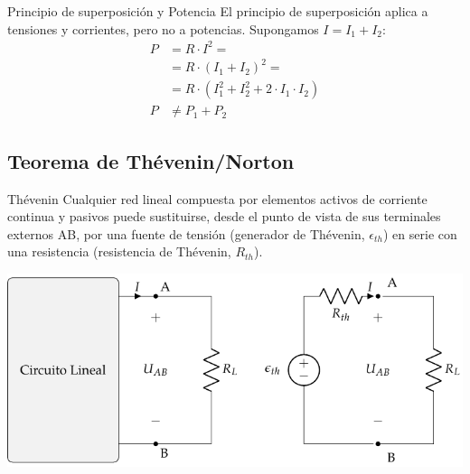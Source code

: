 \documentclass[aspectratio=169, usenames,svgnames,dvipsnames]{beamer}
\begin{document}
\begin{frame}[label={sec:org972d35f}]{Principio de superposición y Potencia}
El principio de superposición aplica a tensiones y corrientes, pero \alert{no} a potencias. Supongamos \(I = I_1 + I_2\):
\begin{align*}
  P &= R \cdot I^2 =\\
       &= R \cdot (I_1 + I_2)^2 =\\
       &=R \cdot (I_1^2 + I_2^2 + 2\cdot I_1 \cdot I_2)\\
  P &\neq P_1 + P_2
\end{align*}
\end{frame}


\subsection{Teorema de Thévenin/Norton}
\label{sec:orgfe5f9b9}

\begin{frame}[label={sec:org43d7ad0}]{Thévenin}
Cualquier \alert{red lineal} compuesta por elementos activos de corriente continua y pasivos puede sustituirse, desde el punto de vista de sus terminales externos AB, por una \alert{fuente de tensión} (generador de Thévenin, \(\epsilon_{th}\)) en \alert{serie} con una resistencia (resistencia de Thévenin, \(R_{th}\)).
\begin{center}
\includegraphics[height=0.6\textheight]{../figs/EquivalenteThevenin_R.pdf}
\end{center}
\end{frame}
\end{document}
